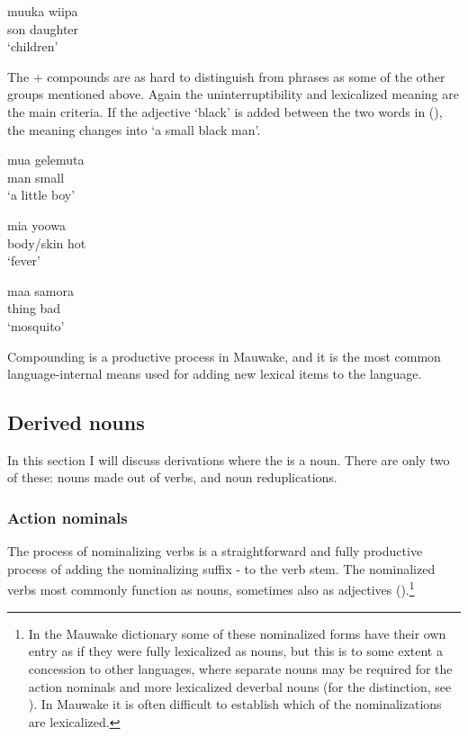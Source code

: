 \ea%
\label{ex:x51}
\gll muuka wiipa \\
son daughter\\
\glt`children'
\z

The + compounds are as hard to distinguish from phrases as some of the other groups mentioned above. Again the uninterruptibility and lexicalized meaning are the main criteria. If the adjective  `black' is added between the two words in (), the meaning changes into `a small black man'.

\ea%
\label{ex:x57}
\gll mua gelemuta \\
man small\\
\glt`a little boy'
\z

\ea%
\label{ex:x58}
\gll mia yoowa \\
body/skin hot\\
\glt`fever'
\z

\ea%
\label{ex:x59}
\gll maa samora \\
thing bad\\
\glt`mosquito'
\z

Compounding is a productive process in Mauwake, and it is the most common language-internal means used for adding new lexical items to the language. 

\subsection{Derived nouns}
{}
In this section I will discuss derivations where the  is a noun. There are only two of these: nouns made out of verbs, and noun reduplications. 

\subsubsection[Action nominals]{Action nominals}
{}
The process of nominalizing verbs is a straightforward and fully productive process of adding the nominalizing suffix - to the verb stem. The nominalized verbs most commonly function as nouns, sometimes also as adjectives ().\footnote{In the Mauwake dictionary some of these nominalized forms have their own entry as if they were fully lexicalized as nouns, but this is to some extent a concession to other languages, where separate nouns may be required for the action nominals and more lexicalized deverbal nouns (for the distinction, see \citealt[193]{Ylikoski2003}). In Mauwake it is often difficult to establish which of the nominalizations are lexicalized.}

